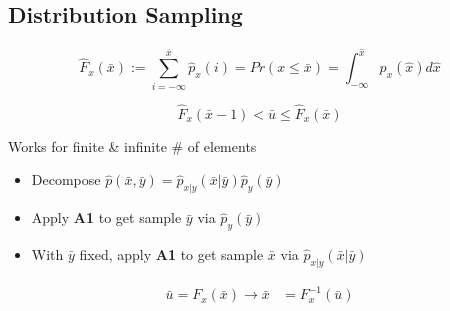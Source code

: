 \subsection{Distribution Sampling}
    \begin{equation*}
        \widehat{F}_x(\bar{x}) := \textstyle\sum_{i=-\infty}^{\bar{x}}\widehat{p}_x(i) = Pr(x \leq \bar{x}) = \int_{-\infty}^{\hat{x}} p_x(\hat{x}) d\hat{x}
    \end{equation*}

    \begin{equation*}
        \widehat{F}_x(\bar{x}-1) < \bar{u} \leq \widehat{F}_x(\bar{x})  
    \end{equation*}
        

    Works for finite \& infinite \# of elements
    \begin{itemize}[leftmargin=1em]
        \item Decompose $\widehat{p}(\bar{x},\bar{y}) = \widehat{p}_{x|y}(\bar{x}|\bar{y})\widehat{p}_y(\bar{y})$
        \item Apply \textbf{A1} to get sample $\bar{y}$ via $\widehat{p}_y(\bar{y})$
        \item With $\bar{y}$ fixed, apply \textbf{A1} to get sample $\bar{x}$ via $\widehat{p}_{x|y}(\bar{x}|\bar{y})$
    \end{itemize}
    
    \begin{align*}
        \bar{u} = F_x(\bar{x})  \to \bar{x} &= F_x^{-1}(\bar{u})
    \end{align*}

    \vfill\null\columnbreak
